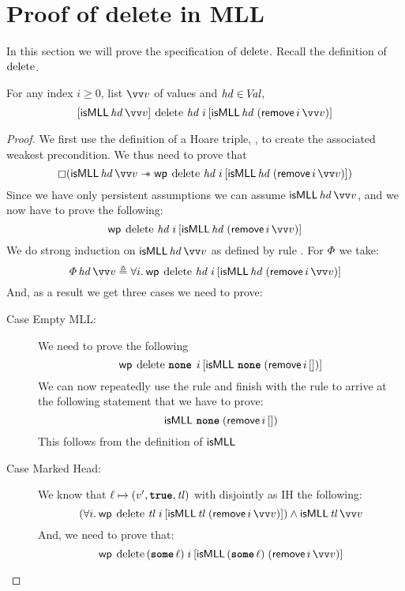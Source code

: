 \documentclass[thesis.tex]{subfiles}
\begin{document}
\section{Proof of delete in MLL}
\label{sec:proofmll}
In this section we will prove the specification of $\operatorname{delete}$. Recall the definition of $\operatorname{delete}$.
\MLLDeleteProg
\\
\begin{lemma}
  For any index $i \ge 0$, list $\vect{\val}$ of values and $\mathit{hd}\in\kern-0.2em\textit{Val}$,
  \[
    \hoare{\isMLL\, \langv{hd}\, \vect{\val}}{\MLLdelete\, \langv{hd}\; \iindex }{\isMLL\, \langv{hd}\; (\textlog{remove}\, \iindex\, \vect{v})}
  \]
\end{lemma}
\begin{proof}
  We first use the definition of a Hoare triple, , to create the associated weakest precondition.
  We thus need to prove that
  \[\always(\isMLL\, \langv{hd}\, \vect{\val} \wand \wpre{\MLLdelete\, \langv{hd}\; \iindex}{\isMLL\, \langv{hd}\; (\textlog{remove}\, \iindex\, \vect{v})})\]
  Since we have only persistent assumptions we can assume
  $\isMLL\, \langv{hd}\, \vect{\val}$, and we now have to prove the following:
  \[\wpre{\MLLdelete\, \langv{hd}\; \iindex}{\isMLL\, \langv{hd}\; (\textlog{remove}\, \iindex\, \vect{v})}\]
  We do strong induction on $\isMLL\, \langv{hd}\, \vect{\val}$ as defined by rule . For $\varPhi$ we take:
  \[
    \pred\, \langv{hd}\, \vect{\val} \eqdef \All \iindex. \wpre{\MLLdelete\, \langv{hd}\; \iindex}{\isMLL\, \langv{hd}\; (\textlog{remove}\, \iindex\, \vect{v})}
  \]
  And, as a result we get three cases we need to prove:
  \begin{description}
    \item[Case Empty MLL:] We need to prove the following
      \[\wpre{\MLLdelete\, \None\; \iindex}{\isMLL\, \None\; (\textlog{remove}\, \iindex\, [])}\]
      We can now repeatedly use the  rule and finish with the rule  to arrive at the following statement that we have to prove:
      \[\textsf{\upshape isMLL}\, \operatorname{\texttt{\bfseries none}}\; (\textsf{\upshape remove}\, i\, [])\]
      This follows from the definition of $\textsf{\upshape isMLL}$
    \item[Case Marked Head:] We know that $\loc \fmapsto (\val', \True, \langv{tl})$ with disjointly as IH the following:
      \[\left(\All \iindex. \wpre{\MLLdelete\, \langv{tl}\; \iindex}{\isMLL\, \langv{tl}\; (\textlog{remove}\, \iindex\, \vect{\val})}\right) \land \isMLL\, \langv{tl}\, \vect{\val}\]
      And, we need to prove that:
      \[\wpre{\MLLdelete\, (\Some \loc)\; \iindex}{\isMLL\, (\Some \loc)\; (\textlog{remove}\, \iindex\, \vect{v})}\]

\end{description}
\end{proof}
\end{document}
